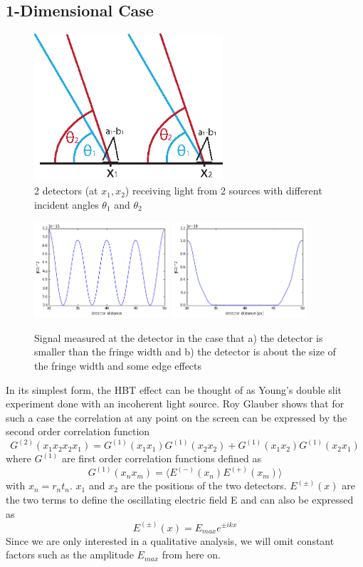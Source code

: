 \documentclass{article}
\begin{document}
\subsection{1-Dimensional Case}
\begin{figure}[ht!]
	\centering
	\includegraphics[width=70mm]{figure_2slit}
	\caption{2 detectors (at \(x_1, x_2\)) receiving light from 2 sources with different incident angles \(\theta_1\) and \(\theta_2\) \label{fig:2slit_setup}
	}
\end{figure}
\begin{figure}[ht!]
	\centering
	\includegraphics[width=50mm]{1d_detsize_sthan_wave}
	\includegraphics[width=50mm]{1d_detsize_eq_wave}
	\caption{Signal measured at the detector in the case that a) the detector is smaller than the fringe width and b) the detector is about the size of the fringe width and some edge effects\label{fig:1d_detsize}
	}
\end{figure}
In its simplest form, the \ac{HBT} effect can be thought of as Young’s double slit experiment done with an incoherent light source. Roy Glauber \cite{glauber2006} shows that for such a case the correlation at any point on the screen can be expressed by the second order correlation function \[G^{(2)}(x_1 x_2 x_2 x_1) = G^{(1)}(x_1 x_1) G^{(1)}(x_2 x_2) + G^{(1)}(x_1 x_2) G^{(1)}(x_2 x_1)\] where \(G^{(1)}\) are first order correlation functions defined as \[G^{(1)}(x_n x_m) = \langle E^{(-)}(x_n) E^{(+)}(x_m) \rangle\] with \(x_n = r_n t_n\). $x_1$ and $x_2$ are the positions of the two detectors.
\(E^{(\pm)}(x)\) are the two terms to define the oscillating electric field E and can also be expressed as \[E^{(\pm)}(x) = E_{max} e^{\pm i k x }\] 
Since we are only interested in a qualitative analysis, we will omit constant factors such as the amplitude \(E_{max}\) from here on. 
\end{document}
